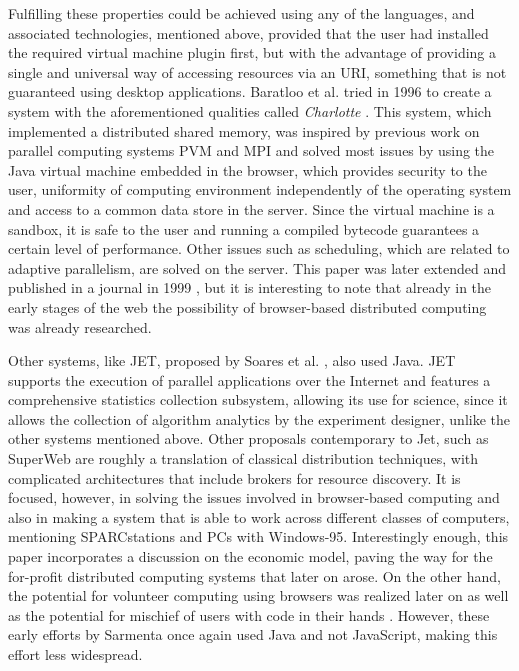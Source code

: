 \documentclass[journal,onecolumn]{IEEEtran}
\begin{document}
Fulfilling these properties could be achieved using any of the
languages, and associated technologies, mentioned above, provided that the user had
installed the required virtual machine plugin first, but with the advantage of
providing a single and universal way of accessing resources via an
URI, something that is not guaranteed using desktop
applications. Baratloo et al. tried in 1996 to create a system with
the aforementioned qualities called {\em Charlotte}
\cite{baratloo1996charlotte}. This system, which implemented a
distributed shared memory, was inspired by previous work
on parallel computing systems PVM and MPI and solved most issues by
using the Java virtual machine embedded in the browser,
which provides
security to the user, uniformity of computing environment
independently of the operating system and access to a common data store in the
server. Since the virtual machine is a sandbox, it is safe to the user
and running a compiled bytecode guarantees a certain level of
performance. 
 Other issues such as scheduling, which are related to adaptive
 parallelism, are solved on the server. This 
paper was later extended and published in a journal in 1999
\cite{baratloo1999charlotte}, but it is interesting to note that
already in the early stages of the web the possibility of
browser-based distributed computing was already researched. 

Other systems, like JET, proposed by Soares et
al. \cite{soares1998get}, also used Java. JET supports 
the execution of parallel applications over the Internet and features
a comprehensive statistics collection subsystem, allowing its use for science,
since it allows the collection of algorithm analytics by the
experiment designer, unlike the other systems mentioned
above. Other proposals contemporary to Jet, such as SuperWeb
\cite{alexandrov1997superweb} are roughly a translation of classical
distribution techniques, with complicated architectures that include
brokers for resource discovery. It is focused, however, in solving the
issues involved in browser-based computing and also in making a system
that is able to work across different classes of computers, mentioning
SPARCstations and PCs with Windows-95. Interestingly enough, this
paper incorporates a discussion on the economic model, paving the way
for the for-profit distributed computing systems that later on
arose. On the other hand, the potential for volunteer computing using
browsers was realized 
later on \cite{sarmenta-bayanihan} as well as the potential for
mischief of users with code in their hands
\cite{sarmenta-sabotagetolerance}. However, these early efforts by
Sarmenta once again used Java and not JavaScript, making this effort
less widespread.
\end{document}
